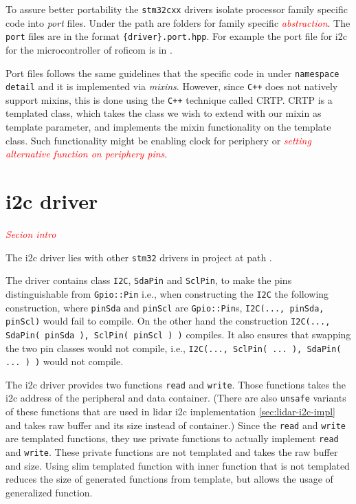 \documentclass[
  digital,     %
  oneside,     %
  nosansbold,  %
  nocolorbold, %
  lof,         %
  lot,         %
]{fithesis4}
\newcommand{\TODO}[1]{\textcolor{red}{\textit{#1}}}
\begin{document}
{{{To assure better portability the \verb|stm32cxx| drivers isolate processor family specific code into \emph{port} files. Under the path  are folders for family specific \TODO{abstraction}. The \verb|port| files are in the format \verb|{driver}.port.hpp|. For example the port file for \acrshort{i2c} for the microcontroller of \acrshort{roficom} is in .

Port files follows the same guidelines that the specific code in under \lstinline|namespace detail| and it is implemented via \emph{mixins}. However, since \verb|C++| does not natively support mixins, this is done using the \verb|C++| technique called CRTP. CRTP is a templated class, which takes the class we wish to extend with our mixin as template parameter, and implements the mixin functionality on the template class. Such functionality might be enabling clock for periphery or \TODO{setting alternative function on periphery pins}.

\section[ I2C driver ]{ \acrshort{i2c} driver }
\TODO{Secion intro}

The \acrshort{i2c} driver lies with other \verb|stm32| drivers in project at path .

The driver contains class \lstinline|I2C|, \lstinline|SdaPin| and \lstinline|SclPin|, to make the pins distinguishable from \lstinline|Gpio::Pin| i.e., when constructing the \lstinline|I2C| the following construction, where \lstinline|pinSda| and \lstinline|pinScl| are \lstinline|Gpio::Pin|s, \lstinline|I2C(..., pinSda, pinScl)| would fail to compile. On the other hand the construction \lstinline|I2C(..., SdaPin( pinSda ), SclPin( pinScl ) )| compiles. It also ensures that swapping the two pin classes would not compile, i.e., \lstinline|I2C(..., SclPin( ... ), SdaPin( ... ) )| would not compile.

The \acrshort{i2c} driver provides two functions \lstinline|read| and \lstinline|write|. Those functions takes the \acrshort{i2c} address of the peripheral and data container. (There are also \lstinline|unsafe| variants of these functions that are used in \acrshort{lidar} \acrshort{i2c} implementation \ref{sec:lidar-i2c-impl} and takes raw buffer and its size instead of container.) Since the \lstinline|read| and \lstinline|write| are templated functions, they use private functions to actually implement \lstinline|read| and \lstinline|write|. These private functions are not templated and takes the raw buffer and size. Using slim templated function with inner function that is not templated reduces the size of generated functions from template, but allows the usage of generalized function.

}}}
\end{document}
